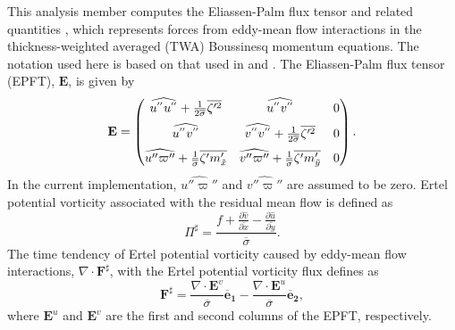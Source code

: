 \newcommand{\Dt}[1]{ \frac{D {#1}}{D t} }
\newcommand{\Dts}[1]{ \frac{D^\sharp {#1}}{D t} }
\newcommand{\ddt}[1]{ \frac{\partial {#1}}{\partial t} }
\newcommand{\ddx}[1]{ \frac{\partial {#1}}{\partial x} }
\newcommand{\ddy}[1]{ \frac{\partial {#1}}{\partial y} }
\newcommand{\ddz}[1]{ \frac{\partial {#1}}{\partial z} }
\newcommand{\ddtb}[1]{ \frac{\partial {#1}}{\partial \tilde{t}} }
\newcommand{\ddxb}[1]{ \frac{\partial {#1}}{\partial \tilde{x}} }
\newcommand{\ddyb}[1]{ \frac{\partial {#1}}{\partial \tilde{y}} }
\newcommand{\ddb}[1]{ \frac{\partial {#1}}{\partial \tilde{b}} }
\newcommand{\ol}{ \overline }
This analysis member computes the Eliassen-Palm flux tensor and related quantities \citep{young_2012, maddison_marshall_2013}, which represents forces from eddy-mean flow interactions in the thickness-weighted averaged (TWA) Boussinesq momentum equations.
The notation used here is based on that used in \cite{young_2012} and \cite{saenz_etal_2015a}.
The Eliassen-Palm flux tensor (EPFT), $\mathbf{E}$, is given by
%
\begin{equation}
\mathbf{E} = \left(
\begin{matrix}
  \vspace{0.2 cm}
  \widehat{u^{''}u^{''}} +  \frac{1}{2 \overline \sigma} \overline{{\zeta'^2}} & \widehat{u^{''}v^{''}} & 0 \\
  \vspace{0.2 cm}
  \widehat{u^{''}v^{''}} & \widehat{v^{''}v^{''}} +  \frac{1}{2 \overline \sigma} \overline{{\zeta'^2}} & 0 \\
  \widehat{u'' \varpi''} + \frac{1}{\overline \sigma} \overline{{\zeta' m'_{\tilde x}}}  & \widehat{v'' \varpi''} +  \frac{1}{\overline \sigma} \overline{{\zeta' m'_{\tilde y}}} & 0
 \end{matrix}
 \right ).
\label{eq:fullEPFT}
\end{equation}
%
In the current implementation, $\widehat{u'' \varpi''}$ and $\widehat{v'' \varpi''}$ are assumed to be zero.
Ertel potential vorticity associated with the residual mean flow is defined as
\begin{equation}
\Pi^\sharp = \frac{f + \ddxb{ \hat v } - \ddyb{ \hat u }}{\ol \sigma}.
\label{eq:EPVtwa}
\end{equation}
%
The time tendency of Ertel potential vorticity caused by eddy-mean flow interactions, $\nabla \cdot \mathbf{F}^\sharp$, with the Ertel potential vorticity flux defines as
%
\begin{equation}
\mathbf{F^\sharp} = \frac{\nabla \cdot \mathbf{E}^v}{\ol \sigma} \mathbf{\ol e_1} - 
	\frac{\nabla \cdot \mathbf{E}^u}{\ol \sigma} \mathbf{\ol e_2}, \label{eq:EPV_fluxes_twa}
\end{equation}
%
where $\mathbf{E}^u$ and $\mathbf{E}^v$ are the first and second columns of the EPFT, respectively.

